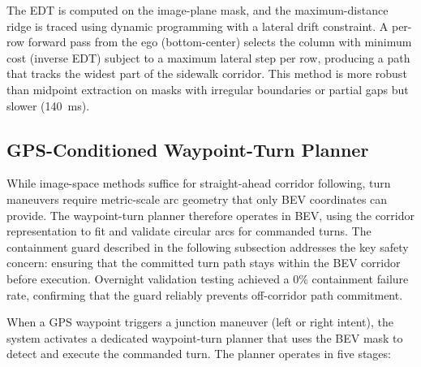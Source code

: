 \documentclass[12pt,letterpaper,oneside]{report}
\begin{document}
The EDT is computed on the image-plane mask, and the maximum-distance ridge is traced using dynamic programming with a lateral drift constraint. A per-row forward pass from the ego (bottom-center) selects the column with minimum cost (inverse EDT) subject to a maximum lateral step per row, producing a path that tracks the widest part of the sidewalk corridor. This method is more robust than midpoint extraction on masks with irregular boundaries or partial gaps but slower (\SI{140}{ms}).


\subsection{GPS-Conditioned Waypoint-Turn Planner}
\label{sec:waypoint_turn_method}

While image-space methods suffice for straight-ahead corridor following, turn maneuvers require metric-scale arc geometry that only BEV coordinates can provide. The waypoint-turn planner therefore operates in BEV, using the corridor representation to fit and validate circular arcs for commanded turns. The containment guard described in the following subsection addresses the key safety concern: ensuring that the committed turn path stays within the BEV corridor before execution. Overnight validation testing achieved a 0\% containment failure rate, confirming that the guard reliably prevents off-corridor path commitment.

When a GPS waypoint triggers a junction maneuver (left or right intent), the system activates a dedicated waypoint-turn planner that uses the BEV mask to detect and execute the commanded turn. The planner operates in five stages:
\end{document}
